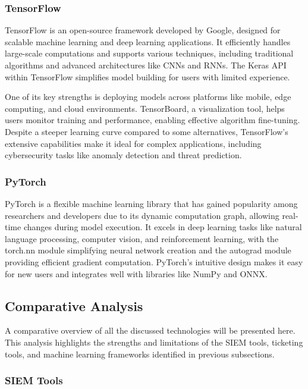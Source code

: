 \subsubsection{TensorFlow}
TensorFlow is an open-source framework developed by Google, designed for scalable machine learning and deep learning applications. 
It efficiently handles large-scale computations and supports various techniques, including traditional algorithms and advanced architectures like CNNs and RNNs. 
The Keras API within TensorFlow simplifies model building for users with limited experience.

One of its key strengths is deploying models across platforms like mobile, edge computing, and cloud environments. 
TensorBoard, a visualization tool, helps users monitor training and performance, enabling effective algorithm fine-tuning. 
Despite a steeper learning curve compared to some alternatives, TensorFlow's extensive capabilities make it ideal for complex applications, including cybersecurity tasks like anomaly detection and threat prediction.

\subsubsection{PyTorch}
PyTorch is a flexible machine learning library that has gained popularity among researchers and developers due to its dynamic computation graph, allowing real-time changes during model execution. 
It excels in deep learning tasks like natural language processing, computer vision, and reinforcement learning, with the torch.nn module simplifying neural network creation and the autograd module providing efficient gradient computation. 
PyTorch's intuitive design makes it easy for new users and integrates well with libraries like NumPy and ONNX. 

\subsection{Comparative Analysis}

A comparative overview of all the discussed technologies will be presented here. This analysis highlights the strengths and limitations of the SIEM tools, ticketing tools, and machine learning frameworks identified in previous subsections.

\subsubsection{SIEM Tools}


